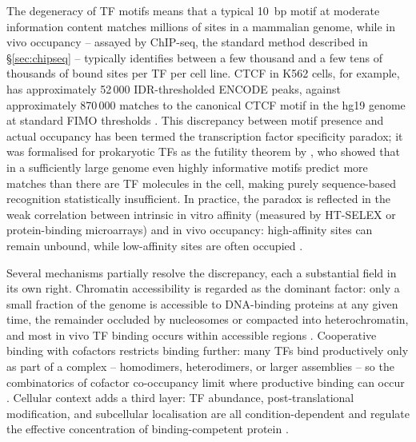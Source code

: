 The degeneracy of TF motifs means that a typical 10~bp motif at moderate information content matches millions of sites in a mammalian genome, while in vivo occupancy -- assayed by ChIP-seq, the standard method described in §\ref{sec:chipseq} -- typically identifies between a few thousand and a few tens of thousands of bound sites per TF per cell line.
CTCF in K562 cells, for example, has approximately 52\,000 IDR-thresholded ENCODE peaks, against approximately 870\,000 matches to the canonical CTCF motif in the hg19 genome at standard FIMO thresholds \cite{dozmorovCTCFBioconductorData2022}.
This discrepancy between motif presence and actual occupancy has been termed the transcription factor specificity paradox; it was formalised for prokaryotic TFs as the futility theorem by \citet{wunderlichDifferentGeneRegulation2009}, who showed that in a sufficiently large genome even highly informative motifs predict more matches than there are TF molecules in the cell, making purely sequence-based recognition statistically insufficient.
In practice, the paradox is reflected in the weak correlation between intrinsic in vitro affinity (measured by HT-SELEX or protein-binding microarrays) and in vivo occupancy:
high-affinity sites can remain unbound, while low-affinity sites are often occupied \cite{slatteryAbsenceSimpleCode2014a}.

Several mechanisms partially resolve the discrepancy, each a substantial field in its own right.
Chromatin accessibility is regarded as the dominant factor: only a small fraction of the genome is accessible to DNA-binding proteins at any given time, the remainder occluded by nucleosomes or compacted into heterochromatin, and most in vivo TF binding occurs within accessible regions \cite{thurmanAccessibleChromatinLandscape2012}.
Cooperative binding with cofactors restricts binding further: many TFs bind productively only as part of a complex -- homodimers, heterodimers, or larger assemblies -- so the combinatorics of cofactor co-occupancy limit where productive binding can occur \cite{sonmezerMolecularCooccupancyIdentifies2021}.
Cellular context adds a third layer: TF abundance, post-translational modification, and subcellular localisation are all condition-dependent and regulate the effective concentration of binding-competent protein \cite{kribelbauerLowAffinityBindingSites2019}.

